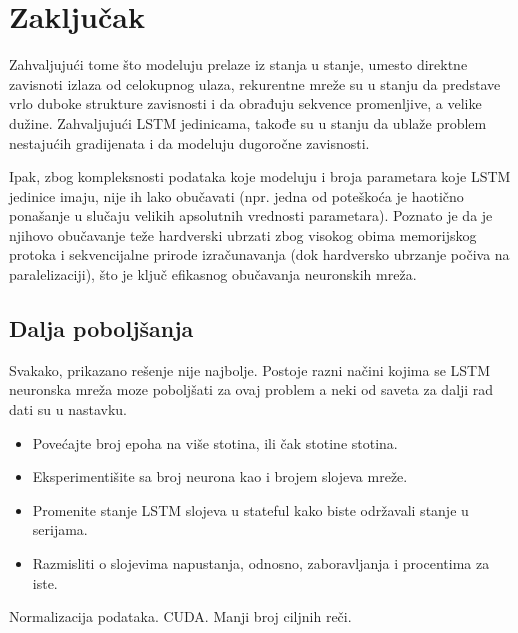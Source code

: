 \documentclass[a4paper]{article}
\begin{document}
\section{Zaključak}

Zahvaljujući tome što modeluju prelaze iz stanja u stanje, umesto direktne zavisnoti izlaza od celokupnog ulaza, rekurentne mreže su u stanju da predstave vrlo duboke strukture zavisnosti i da obrađuju sekvence promenljive, a velike dužine. Zahvaljujući LSTM jedinicama, takođe su u stanju da ublaže problem nestajućih gradijenata i da modeluju dugoročne zavisnosti. 

Ipak, zbog kompleksnosti podataka koje modeluju i broja parametara koje LSTM jedinice imaju, nije ih lako obučavati (npr. jedna od poteškoća je haotično ponašanje u slučaju velikih apsolutnih vrednosti parametara). Poznato je da je njihovo obučavanje teže hardverski ubrzati zbog visokog obima memorijskog protoka i sekvencijalne prirode izračunavanja (dok hardversko ubrzanje počiva na paralelizaciji), što je ključ efikasnog obučavanja neuronskih mreža.

\subsection{Dalja poboljšanja}

Svakako, prikazano rešenje nije najbolje. Postoje razni načini kojima se LSTM neuronska mreža moze poboljšati za ovaj problem a neki od saveta za dalji rad dati su u nastavku.  
\begin{itemize}
    \item Povećajte broj epoha na više stotina, ili čak stotine stotina.
    \item Eksperimentišite sa broj neurona kao i brojem slojeva mreže.
    \item Promenite stanje LSTM slojeva u stateful kako biste održavali stanje u serijama.
    \item Razmisliti o slojevima napustanja, odnosno, zaboravljanja i procentima za iste.
\end{itemize}
Normalizacija podataka. CUDA. Manji broj ciljnih reči.

\label{sec:zakljucak}




\appendix
 

\end{document}
